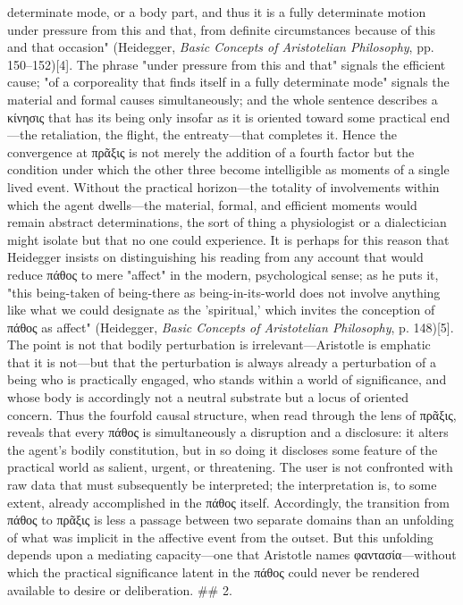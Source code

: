 \documentclass{article}
\begin{document}
determinate mode, or a body part, and thus it is a fully determinate motion under pressure from this and that, from definite circumstances because of this and that occasion" (Heidegger, \textit{Basic Concepts of Aristotelian Philosophy}, pp. 150–152)[4]. The phrase "under pressure from this and that" signals the efficient cause; "of a corporeality that finds itself in a fully determinate mode" signals the material and formal causes simultaneously; and the whole sentence describes a κίνησις that has its being only insofar as it is oriented toward some practical end—the retaliation, the flight, the entreaty—that completes it. Hence the convergence at πρᾶξις is not merely the addition of a fourth factor but the condition under which the other three become intelligible as moments of a single lived event. Without the practical horizon—the totality of involvements within which the agent dwells—the material, formal, and efficient moments would remain abstract determinations, the sort of thing a physiologist or a dialectician might isolate but that no one could experience. It is perhaps for this reason that Heidegger insists on distinguishing his reading from any account that would reduce πάθος to mere "affect" in the modern, psychological sense; as he puts it, "this being-taken of being-there as being-in-its-world does not involve anything like what we could designate as the 'spiritual,' which invites the conception of πάθος as affect" (Heidegger, \textit{Basic Concepts of Aristotelian Philosophy}, p. 148)[5]. The point is not that bodily perturbation is irrelevant—Aristotle is emphatic that it is not—but that the perturbation is always already a perturbation of a being who is practically engaged, who stands within a world of significance, and whose body is accordingly not a neutral substrate but a locus of oriented concern. Thus the fourfold causal structure, when read through the lens of πρᾶξις, reveals that every πάθος is simultaneously a disruption and a disclosure: it alters the agent's bodily constitution, but in so doing it discloses some feature of the practical world as salient, urgent, or threatening. The user is not confronted with raw data that must subsequently be interpreted; the interpretation is, to some extent, already accomplished in the πάθος itself. Accordingly, the transition from πάθος to πρᾶξις is less a passage between two separate domains than an unfolding of what was implicit in the affective event from the outset. But this unfolding depends upon a mediating capacity—one that Aristotle names φαντασία—without which the practical significance latent in the πάθος could never be rendered available to desire or deliberation. ## 2. 
\end{document}
